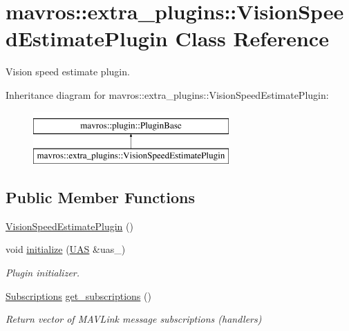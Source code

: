 \hypertarget{classmavros_1_1extra__plugins_1_1VisionSpeedEstimatePlugin}{}\section{mavros\+::extra\+\_\+plugins\+::Vision\+Speed\+Estimate\+Plugin Class Reference}
\label{classmavros_1_1extra__plugins_1_1VisionSpeedEstimatePlugin}


Vision speed estimate plugin.  


Inheritance diagram for mavros\+::extra\+\_\+plugins\+::Vision\+Speed\+Estimate\+Plugin\+:\begin{figure}[H]
\begin{center}
\leavevmode
\includegraphics[height=2.000000cm]{classmavros_1_1extra__plugins_1_1VisionSpeedEstimatePlugin}
\end{center}
\end{figure}
\subsection*{Public Member Functions}
\begin{DoxyCompactItemize}
\item 
\mbox{\hyperlink{group__plugin_ga07495c5fc78a5b2e75f92d062c2ed7b1}{Vision\+Speed\+Estimate\+Plugin}} ()
\item 
void \mbox{\hyperlink{group__plugin_ga81a7aa98620a46b76f89020201d47198}{initialize}} (\mbox{\hyperlink{classmavros_1_1UAS}{U\+AS}} \&uas\+\_\+)
\begin{DoxyCompactList}\small\item\em Plugin initializer. \end{DoxyCompactList}\item 
\mbox{\hyperlink{group__plugin_ga8967d61fc77040e0c3ea5a4585d62a09}{Subscriptions}} \mbox{\hyperlink{group__plugin_gaf84b1b053a36a50e34346d397033dada}{get\+\_\+subscriptions}} ()
\begin{DoxyCompactList}\small\item\em Return vector of M\+A\+V\+Link message subscriptions (handlers) \end{DoxyCompactList}\end{DoxyCompactItemize}
